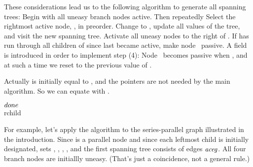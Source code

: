 These considerations lead us to the following algorithm to
generate
all spanning trees: Begin with all uneasy branch nodes active. Then
repeatedly
\smallskip{} Select the rightmost active node, , in
preorder.
\smallskip{} Change  to , update all values
of the tree, and visit the new spanning tree.
\smallskip{} Activate all uneasy nodes to the right of .
\smallskip{} If  has run through all children of
since  last became active, make node~ passive.
\smallskip\noindent
A field  is introduced in order to implement step (4):
Node~
becomes passive when , and at such a time
we reset
 to the previous value of .

Actually  is initially equal to ,
and the 
pointers are not needed by the main algorithm. So we can equate
 with .

\Y\B\4\D$\\{done}$ \5
\\{rchild}\par
\fi

For example, let's apply the algorithm to the
series-parallel graph
illustrated in the introduction. Since  is a parallel node and since
each leftmost child is initially designated,  sets
, , , , and the first spanning
tree consists of edges $\it aceg$. All four branch nodes are initiallly
uneasy. (That's just a coincidence, not a general rule.)

